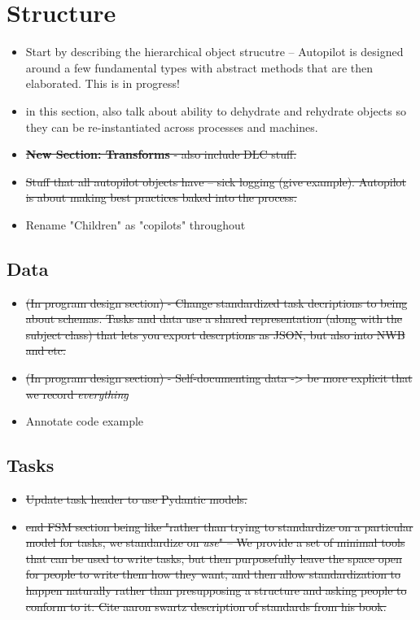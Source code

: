 \section{Structure}

\begin{itemize}
\item Start by describing the hierarchical object strucutre -- Autopilot is designed around a few fundamental types with abstract methods that are then elaborated. This is in progress!
\item in this section, also talk about ability to dehydrate and rehydrate objects so they can be re-instantiated across processes and machines.
\item \sout{\textbf{New Section: Transforms} - also include DLC stuff.}
\item \sout{Stuff that all autopilot objects have -- sick logging (give example). Autopilot is about making best practices baked into the process. }
\item Rename "Children" as "copilots" throughout
\end{itemize}

\subsection{Data}

\begin{itemize}
\item \sout{(In program design section) - Change standardized task decriptions to being about schemas. Tasks and data use a shared representation (along with the subject class) that lets you export descrptions as JSON, but also into NWB and etc.}
\item \sout{(In program design section) - Self-documenting data -> be more explicit that we record \textit{everything}}
\item Annotate code example
\end{itemize}

\subsection{Tasks}

\begin{itemize}
\item \sout{Update task header to use Pydantic models.}
\item \sout{end FSM section being like "rather than trying to standardize on a particular model for tasks, we standardize on \textit{use}" -- We provide a set of minimal tools that can be used to write tasks, but then purposefully leave the space open for people to write them how they want, and then allow standardization to happen naturally rather than presupposing a structure and asking people to conform to it. Cite aaron swartz description of standards from his book.}
\end{itemize}

